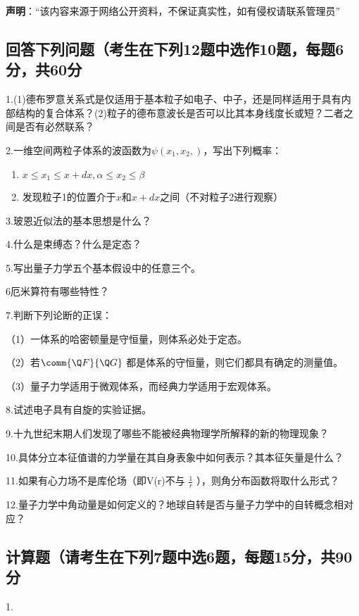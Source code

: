 
\textbf{声明}：“该内容来源于网络公开资料，不保证真实性，如有侵权请联系管理员”

\subsection{回答下列问题（考生在下列12题中选作10题，每题6分，共60分}

1.(1)德布罗意关系式是仅适用于基本粒子如电子、中子，还是同样适用于具有内部结构的复合体系？(2)粒子的德布意波长是否可以比其本身线度长或短？二者之间是否有必然联系？

2.一维空间两粒子体系的波函数为$\psi (x_1, x_2, )$，写出下列概率：
\begin{enumerate}
    \item $x \leq x_1 \leq x + dx, \alpha \leq x_2 \leq \beta$
    \item 发现粒子1的位置介于$x$和$x + dx$之间（不对粒子2进行观察）
\end{enumerate}

3.玻恩近似法的基本思想是什么？

4.什么是束缚态？什么是定态？

5.写出量子力学五个基本假设中的任意三个。

6厄米算符有哪些特性？

7.判断下列论断的正误：

（1）一体系的哈密顿量是守恒量，则体系必处于定态。

（2）若$\comm{\Q F}{\Q G}$ 都是体系的守恒量，则它们都具有确定的测量值。

（3）量子力学适用于微观体系，而经典力学适用于宏观体系。

8.试述电子具有自旋的实验证据。

9.十九世纪末期人们发现了哪些不能被经典物理学所解释的新的物理现象？

10.具体分立本征值谱的力学量在其自身表象中如何表示？其本征矢量是什么？

11.如果有心力场不是库伦场（即V(r)不与 $\frac{1}{r}$ ），则角分布函数将取什么形式？

12.量子力学中角动量是如何定义的？地球自转是否与量子力学中的自转概念相对应？

\subsection{计算题（请考生在下列7题中选6题，每题15分，共90分}

1.
